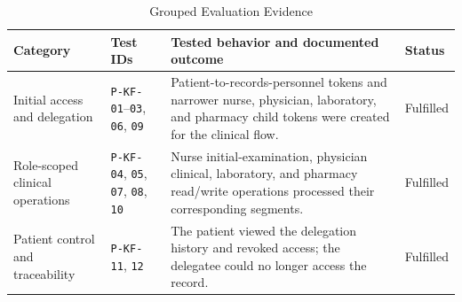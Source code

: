 \documentclass[conference,a4paper,english]{IEEEtran}
\begin{document}
\begin{table}[t]
	\caption{Grouped Evaluation Evidence}
	\label{tab:evaluation-summary}
	\centering
	\small
	\setlength{\tabcolsep}{4pt}
	\begin{tabular}{@{}p{}p{}p{}p{}@{}}
		\toprule
		\textbf{Category}                                                                                                                              & \textbf{Test IDs} & \textbf{Tested behavior and documented outcome} & \textbf{Status} \\
		\midrule
		Initial access and delegation                                                                                                                  &
		\texttt{P-KF-01}--\texttt{03}, \texttt{06}, \texttt{09}                                                                                        &
		Patient-to-records-personnel tokens and narrower nurse, physician, laboratory, and pharmacy child tokens were created for the clinical flow.   &
		Fulfilled                                                                                                                                                                                                                              \\
		Role-scoped clinical operations                                                                                                                &
		\texttt{P-KF-04}, \texttt{05}, \texttt{07}, \texttt{08}, \texttt{10}                                                                           &
		Nurse initial-examination, physician clinical, laboratory, and pharmacy read/write operations processed their corresponding segments.          &
		Fulfilled                                                                                                                                                                                                                              \\
		Patient control and traceability                                                                                                               &
		\texttt{P-KF-11}, \texttt{12}                                                                                                                  &
		The patient viewed the delegation history and revoked access; the delegatee could no longer access the record.                                 &
		Fulfilled                                                                                                                                                                                                                              \\

\end{tabular}
\end{table}
\end{document}
